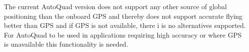 The current AutoQuad version does not support any other source of global positioning than the onboard GPS and thereby does not support accurate flying better than GPS and if GPS is not available, there i is no alternatives supported. For AutoQuad to be used in applications requiring high accuracy or where GPS is unavailable this functionality is needed. \\


